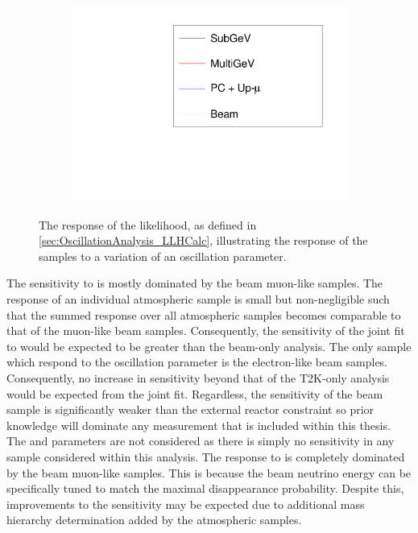 \begin{figure}[h]
\begin{subfigure}[t]{0.5\textwidth}
    \includegraphics[width=\textwidth, trim={0mm 0mm 0mm 0mm}, clip,page=3]{Figures/OA/LLHScans_Osc.pdf}
  \end{subfigure}
  \caption{The response of the likelihood, as defined in \autoref{sec:OscillationAnalysis_LLHCalc}, illustrating the response of the samples to a variation of an oscillation parameter.}
  \label{fig:OscillationAnalysis_LLHScanOscPars}
\end{figure}

The sensitivity to  is mostly dominated by the beam muon-like samples. The response of an individual atmospheric sample is small but non-negligible such that the summed response over all atmospheric samples becomes comparable to that of the muon-like beam samples. Consequently, the sensitivity of the joint fit to would be expected to be greater than the beam-only analysis. The only sample which respond to the  oscillation parameter is the electron-like beam samples. Consequently, no increase in sensitivity beyond that of the T2K-only analysis would be expected from the joint fit. Regardless, the sensitivity of the beam sample is significantly weaker than the external reactor constraint so prior knowledge will dominate any measurement that is included within this thesis. The  and  parameters are not considered as there is simply no sensitivity in any sample considered within this analysis. The response to  is completely dominated by the beam muon-like samples. This is because the beam neutrino energy can be specifically tuned to match the maximal disappearance probability. Despite this, improvements to the  sensitivity may be expected due to additional mass hierarchy determination added by the atmospheric samples.

